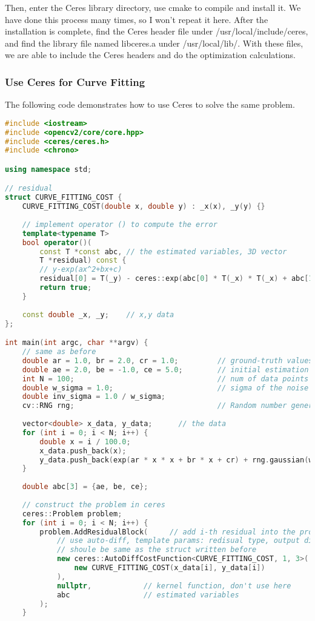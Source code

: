 Then, enter the Ceres library directory, use cmake to compile and install it. We have done this process many times, so I won't repeat it here. After the installation is complete, find the Ceres header file under /usr/local/include/ceres, and find the library file named libceres.a under /usr/local/lib/. With these files, we are able to include the Ceres headers and do the optimization calculations.

\subsubsection{Use Ceres for Curve Fitting}
The following code demonstrates how to use Ceres to solve the same problem.
\begin{lstlisting}[language=c++,caption=slambook/ch6/ceresCurveFitting.cpp]
#include <iostream>
#include <opencv2/core/core.hpp>
#include <ceres/ceres.h>
#include <chrono>

using namespace std;

// residual
struct CURVE_FITTING_COST {
    CURVE_FITTING_COST(double x, double y) : _x(x), _y(y) {}
    
    // implement operator () to compute the error
    template<typename T>
    bool operator()(
        const T *const abc, // the estimated variables, 3D vector
        T *residual) const {
        // y-exp(ax^2+bx+c)
        residual[0] = T(_y) - ceres::exp(abc[0] * T(_x) * T(_x) + abc[1] * T(_x) + abc[2]);
        return true;
    }
    
    const double _x, _y;    // x,y data 
};

int main(int argc, char **argv) {
    // same as before
    double ar = 1.0, br = 2.0, cr = 1.0;         // ground-truth values
    double ae = 2.0, be = -1.0, ce = 5.0;        // initial estimation
    int N = 100;                                 // num of data points
    double w_sigma = 1.0;                        // sigma of the noise
    double inv_sigma = 1.0 / w_sigma;
    cv::RNG rng;                                 // Random number generator 
    
    vector<double> x_data, y_data;      // the data
    for (int i = 0; i < N; i++) {
        double x = i / 100.0;
        x_data.push_back(x);
        y_data.push_back(exp(ar * x * x + br * x + cr) + rng.gaussian(w_sigma * w_sigma));
    }
    
    double abc[3] = {ae, be, ce};
    
    // construct the problem in ceres
    ceres::Problem problem;
    for (int i = 0; i < N; i++) {
        problem.AddResidualBlock(     // add i-th residual into the problem
            // use auto-diff, template params: redisual type, output dimension, input dimension
            // shoule be same as the struct written before
            new ceres::AutoDiffCostFunction<CURVE_FITTING_COST, 1, 3>(
                new CURVE_FITTING_COST(x_data[i], y_data[i])
            ),
            nullptr,            // kernel function, don't use here
            abc                 // estimated variables
        );
    }
    

\end{lstlisting}
